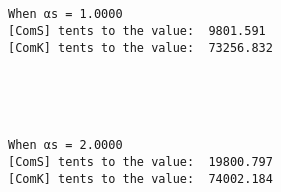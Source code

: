 \documentclass[11pt]{article}
\begin{document}
    \begin{center}
    \end{center}
    { \hspace*{\fill} \\}
    
    \begin{center}
    \end{center}
    { \hspace*{\fill} \\}
    
    \begin{Verbatim}[commandchars=\\\{\}]
When αs = 1.0000
[ComS] tents to the value:  9801.591
[ComK] tents to the value:  73256.832

    \end{Verbatim}

    \begin{center}
    \end{center}
    { \hspace*{\fill} \\}
    
    \begin{center}
    \end{center}
    { \hspace*{\fill} \\}
    
    \begin{Verbatim}[commandchars=\\\{\}]
When αs = 2.0000
[ComS] tents to the value:  19800.797
[ComK] tents to the value:  74002.184

    \end{Verbatim}

    \begin{center}
    \end{center}
    { \hspace*{\fill} \\}
    
    \begin{center}
    \end{center}
    { \hspace*{\fill} \\}
    
\end{document}
